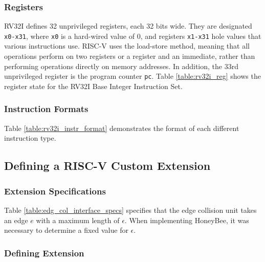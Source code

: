     \subsubsection*{Registers}
        RV32I defines 32 unprivileged registers, each 32 bits wide. They are designated \texttt{x0-x31}, where \texttt{x0} is a hard-wired value of $0$, and registers \texttt{x1-x31} hole values that various instructions use. RISC-V uses the load-store method, meaning that all operations perform on two registers or a register and an immediate, rather than performing operations directly on memory addresses. In addition, the 33rd unprivileged register is the program counter \texttt{pc}. Table \ref{table:rv32i_reg} shows the register state for the RV32I Base Integer Instruction Set.
        

    \subsubsection{Instruction Formats}
        Table \ref{table:rv32i_instr_format} demonstrates the format of each different instruction type. 
        

\subsection{Defining a RISC-V Custom Extension}

\subsubsection{Extension Specifications}

    Table \ref{table:edg_col_interface_specs} specifies that the edge collision unit takes an edge $e$ with a maximum length of $\epsilon$. When implementing HoneyBee, it was necessary to determine a fixed value for $\epsilon$.

\subsubsection{Defining Extension}